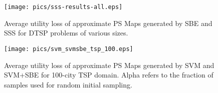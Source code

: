 




\begin{figure}
\begin{center}
\texttt{[image: pics/sss-results-all.eps]}
\caption{Average utility loss of approximate PS Maps generated by SBE and SSS for DTSP problems of various sizes.}
\label{fig:sss-results-all}
\end{center}
\end{figure}



\begin{figure}
\begin{center}
\texttt{[image: pics/svm\_svmsbe\_tsp\_100.eps]}
\caption{Average utility loss of approximate PS Maps generated by SVM and SVM+SBE for 100-city TSP domain. Alpha refers to the fraction of samples used for random initial sampling.}
\label{fig:svm_svmsbe_tsp_100}
\end{center}
\end{figure}









